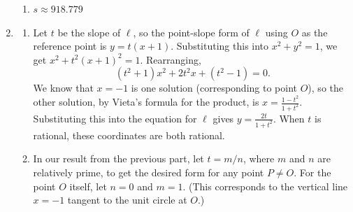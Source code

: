 \begin{enumerate}
\begin{enumerate}
\item $s\approx 918.779$
\end{enumerate}
\item \begin{enumerate}
\item Let $t$ be the slope of $\ell$, so the point-slope form of $\ell$ using $O$ as the reference point is $y = t(x + 1)$. Substituting this into $x^2 + y^2 = 1$, we get $x^2 + t^2(x + 1)^2 = 1$. Rearranging,
\begin{equation*}
(t^2 + 1)x^2 + 2t^2 x + (t^2 - 1) = 0.
\end{equation*}
We know that $x = -1$ is one solution (corresponding to point $O$), so the other solution, by Vieta's formula for the product, is $x = \frac{1 - t^2}{1 + t^2}$. Substituting this into the equation for $\ell$ gives $y = \frac{2t}{1 + t^2}$. When $t$ is rational, these coordinates are both rational.
\item In our result from the previous part, let $t = m/n$, where $m$ and $n$ are relatively prime, to get the desired form for any point $P\neq O$. For the point $O$ itself, let $n = 0$ and $m = 1$. (This corresponds to the vertical line $x = -1$ tangent to the unit circle at $O$.)
\end{enumerate}
\end{enumerate}